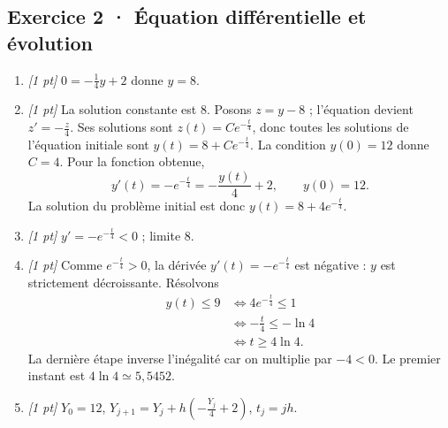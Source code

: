 \subsection*{Exercice 2 · Équation différentielle et évolution}\begin{enumerate}

\item \textit{[1 pt]} $0=-\frac{1}{4}y+2$ donne $y=8$.

\item \textit{[1 pt]} La solution constante est $8$. Posons $z=y-8$ ; l'équation devient $z'=-\frac{z}{4}$. Ses solutions sont $z(t)=Ce^{-\frac{t}{4}}$, donc toutes les solutions de l'équation initiale sont $y(t)=8+Ce^{-\frac{t}{4}}$.
La condition $y(0)=12$ donne $C=4$. Pour la fonction obtenue,
\[y'(t)=-e^{-\frac{t}{4}}=-\frac{y(t)}{4}+2,\qquad y(0)=12.\]
La solution du problème initial est donc $y(t)=8+4e^{-\frac{t}{4}}$.

\item \textit{[1 pt]} $y'=-e^{-\frac{t}{4}}<0$ ; limite $8$.

\item \textit{[1 pt]} Comme $e^{-\frac{t}{4}}>0$, la dérivée $y'(t)=-e^{-\frac{t}{4}}$ est négative : $y$ est strictement décroissante. Résolvons
\[\begin{aligned}y(t)\le 9&\Longleftrightarrow 4e^{-\frac{t}{4}}\le1\\&\Longleftrightarrow -\frac{t}{4}\le-\ln 4\\&\Longleftrightarrow t\ge 4\ln 4.\end{aligned}\]
La dernière étape inverse l'inégalité car on multiplie par $-4<0$. Le premier instant est $4\ln 4\simeq5{,}5452$.

\item \textit{[1 pt]} $Y_0=12$, $Y_{j+1}=Y_j+h(-\frac{Y_j}{4}+2)$, $t_j=jh$.

\end{enumerate}

